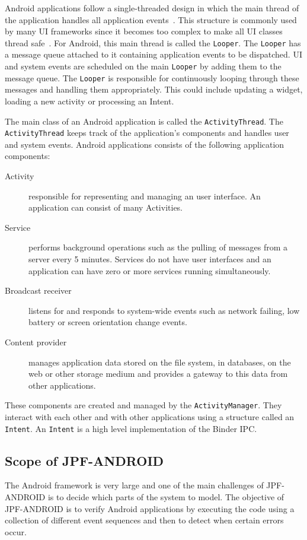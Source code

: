 \documentclass{acm_proc_article-sp}
\begin{document}
Android applications follow a single-threaded design in which the main thread of the application handles all application events~\cite{AndroidDocs}. This structure is
commonly used by many UI frameworks since it becomes too complex to make all UI classes thread safe~\cite{SingleThread}. For Android, this main thread is called
the \texttt{Looper}. The \texttt{Looper} has a message queue attached to it containing application events to be dispatched. UI and system
events are scheduled on the main \texttt{Looper} by adding them to the message
queue. The \texttt{Looper} is responsible for continuously looping through these messages and handling them appropriately. This could
include updating a widget, loading a new activity or processing an Intent.

The main class of an Android application is called the \texttt{ActivityThread}. The \texttt{ActivityThread} keeps track of the
application's components and handles user and system events. Android applications consists of the
following application components:
\begin{description}
\item [Activity] responsible for representing and managing an user interface. An application can consist of many
Activities.
\item [Service] performs background operations such as the pulling of messages from a server every 5 minutes. Services do not have user
interfaces and an application can have zero or more services running simultaneously.
\item [Broadcast receiver] listens for and responds to system-wide events such as network failing, low battery or screen orientation
change events.
\item [Content provider] manages application data stored on the file system, in databases, on the web or other storage medium and provides a
gateway to this data from other applications.
\end{description}

These components are created and managed by the \texttt{ActivityManager}. They interact with each other and with other
applications using a structure called an \texttt{Intent}. An \texttt{Intent} is a high level implementation of the Binder IPC.

\subsection{Scope of JPF-ANDROID}
The Android framework is very large and one of the main challenges of JPF-ANDROID is to decide which parts of the system to model. The
objective of JPF-ANDROID is to verify Android applications by executing the code using a collection of different event sequences and then to
detect when certain errors occur.
\end{document}
